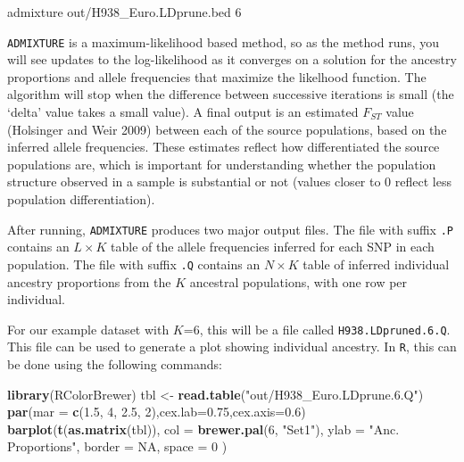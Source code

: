 \documentclass[smallextended]{svmult}       %
\newenvironment{Shaded}{\begin{snugshade}}{\end{snugshade}}
\newcommand{\KeywordTok}[1]{\textcolor[rgb]{0.13,0.29,0.53}{\textbf{#1}}}
\newcommand{\DataTypeTok}[1]{\textcolor[rgb]{0.13,0.29,0.53}{#1}}
\newcommand{\DecValTok}[1]{\textcolor[rgb]{0.00,0.00,0.81}{#1}}
\newcommand{\FloatTok}[1]{\textcolor[rgb]{0.00,0.00,0.81}{#1}}
\newcommand{\StringTok}[1]{\textcolor[rgb]{0.31,0.60,0.02}{#1}}
\newcommand{\OtherTok}[1]{\textcolor[rgb]{0.56,0.35,0.01}{#1}}
\newcommand{\ExtensionTok}[1]{#1}
\newcommand{\NormalTok}[1]{#1}
\begin{document}
\begin{Shaded}
\begin{Highlighting}[]
\ExtensionTok{admixture}\NormalTok{ out/H938_Euro.LDprune.bed 6}
\end{Highlighting}
\end{Shaded}

\texttt{ADMIXTURE} is a maximum-likelihood based method, so as the
method runs, you will see updates to the log-likelihood as it converges
on a solution for the ancestry proportions and allele frequencies that
maximize the likelhood function. The algorithm will stop when the
difference between successive iterations is small (the `delta' value
takes a small value). A final output is an estimated \(F_{ST}\) value
(Holsinger and Weir 2009) between each of the source populations, based
on the inferred allele frequencies. These estimates reflect how
differentiated the source populations are, which is important for
understanding whether the population structure observed in a sample is
substantial or not (values closer to 0 reflect less population
differentiation).

After running, \texttt{ADMIXTURE} produces two major output files. The
file with suffix \texttt{.P} contains an \(L \times K\) table of the
allele frequencies inferred for each SNP in each population. The file
with suffix \texttt{.Q} contains an \(N \times K\) table of inferred
individual ancestry proportions from the \(K\) ancestral populations,
with one row per individual.

For our example dataset with \(K\)=6, this will be a file called
\texttt{H938.LDpruned.6.Q}. This file can be used to generate a plot
showing individual ancestry. In \texttt{R}, this can be done using the
following commands:

\begin{Shaded}
\begin{Highlighting}[]
\KeywordTok{library}\NormalTok{(RColorBrewer)}
\NormalTok{tbl <-}\StringTok{ }\KeywordTok{read.table}\NormalTok{(}\StringTok{"out/H938_Euro.LDprune.6.Q"}\NormalTok{)}
\KeywordTok{par}\NormalTok{(}\DataTypeTok{mar =} \KeywordTok{c}\NormalTok{(}\FloatTok{1.5}\NormalTok{, }\DecValTok{4}\NormalTok{, }\FloatTok{2.5}\NormalTok{, }\DecValTok{2}\NormalTok{),}\DataTypeTok{cex.lab=}\FloatTok{0.75}\NormalTok{,}\DataTypeTok{cex.axis=}\FloatTok{0.6}\NormalTok{)}
\KeywordTok{barplot}\NormalTok{(}\KeywordTok{t}\NormalTok{(}\KeywordTok{as.matrix}\NormalTok{(tbl)),}
  \DataTypeTok{col =} \KeywordTok{brewer.pal}\NormalTok{(}\DecValTok{6}\NormalTok{, }\StringTok{"Set1"}\NormalTok{), }\DataTypeTok{ylab =} \StringTok{"Anc. Proportions"}\NormalTok{,}
  \DataTypeTok{border =} \OtherTok{NA}\NormalTok{, }\DataTypeTok{space =} \DecValTok{0}
\NormalTok{)}
\end{Highlighting}
\end{Shaded}
\end{document}
